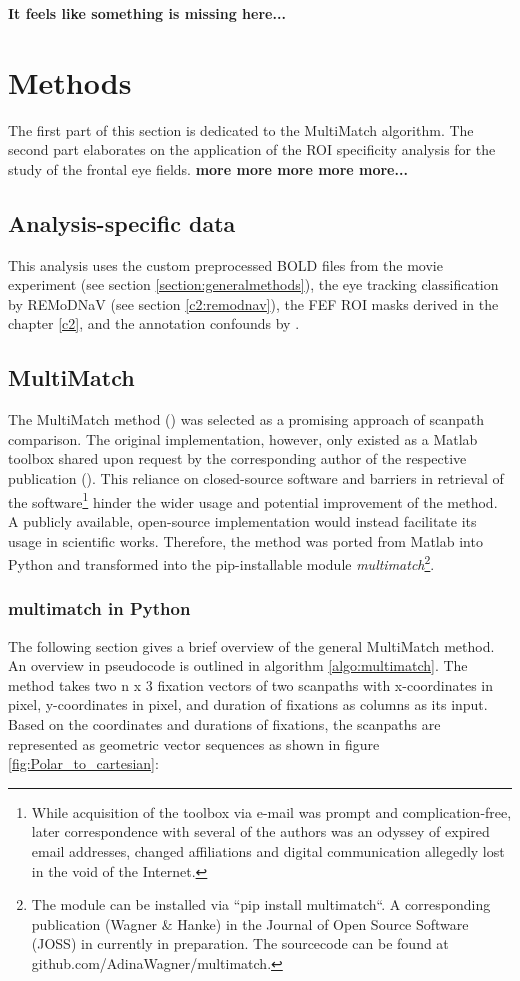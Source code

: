 \documentclass[a4paper, 12pt]{scrreprt}
\begin{document}
 
 \textbf{It feels like something is missing here...}
 
\section{Methods}
The first part of this section is dedicated to the MultiMatch algorithm. The second part elaborates on the application of the ROI specificity analysis for the study of the frontal eye fields.
\textbf{more more more more more...}
\subsection{Analysis-specific data}

This analysis uses the custom preprocessed BOLD files from the movie experiment (see section \ref{section:generalmethods}), the eye tracking classification by REMoDNaV (see section \ref{c2:remodnav}), the FEF ROI masks derived in the chapter \ref{c2}, and the annotation confounds by \textcite{hausler2016annotation}.

\subsection{MultiMatch}\label{section:multimatch}

The MultiMatch method (\cite{jarodzka2010vector}) was selected as a promising approach of scanpath comparison. The original implementation, however, only existed as a Matlab toolbox shared upon request by the corresponding author of the respective publication (\cite{dewhurst2012depends}). This reliance on closed-source software and barriers in retrieval of the software\footnote{While acquisition of the toolbox via e-mail was prompt and complication-free, later correspondence with several of the authors was an odyssey of expired email addresses, changed affiliations and digital communication allegedly lost in the void of the Internet.} hinder the wider usage and potential improvement of the method. A publicly available, open-source implementation would instead facilitate its usage in scientific works. Therefore, the method was ported from Matlab into Python and transformed into the pip-installable module \textit{multimatch}\footnote{The module can be installed via ``pip install multimatch``. A corresponding publication (Wagner \& Hanke) in the Journal of Open Source Software (JOSS) in currently in preparation. The sourcecode can be found at github.com/AdinaWagner/multimatch.}.

\subsubsection{multimatch in Python}
The following section gives a brief overview of the general MultiMatch method. An overview in pseudocode is outlined in algorithm \ref{algo:multimatch}. \newline 
The method takes two n x 3 fixation vectors of two scanpaths with x-coordinates in pixel, y-coordinates in pixel, and duration of fixations as columns as its input. Based on the coordinates and durations of fixations, the scanpaths are represented as geometric vector sequences as shown in figure \ref{fig:Polar_to_cartesian}:
\end{document}
